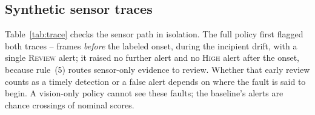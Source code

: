 \documentclass[conference]{IEEEtran}
\begin{document}
\subsection{Synthetic sensor traces}
\begin{table}[!t]
\centering
\caption{Replay of two synthetic run-to-failure traces (600 frames, shape inspired by the IMS bearing~\cite{qiu2006wavelet} and C-MAPSS~\cite{saxena2008damage} data but not derived from them) with good-part visual scores, means over the seven categories. First flag: first non-normal decision relative to the labeled onset (negative = before). Alerts before/from the onset.}
\label{tab:trace}
\footnotesize\setlength{\tabcolsep}{3.5pt}
\resizebox{\columnwidth}{!}{}
\end{table}
Table~\ref{tab:trace} checks the sensor path in isolation. The full policy first flagged both traces \TraceFirstFlagFullMin{}--\TraceFirstFlagFullMax{} frames \emph{before} the labeled onset, during the incipient drift, with a single \textsc{Review} alert; it raised no further alert and no \textsc{High} alert after the onset, because rule~(5) routes sensor-only evidence to review. Whether that early review counts as a timely detection or a false alert depends on where the fault is said to begin. A vision-only policy cannot see these faults; the baseline's alerts are chance crossings of nominal scores.
\end{document}

